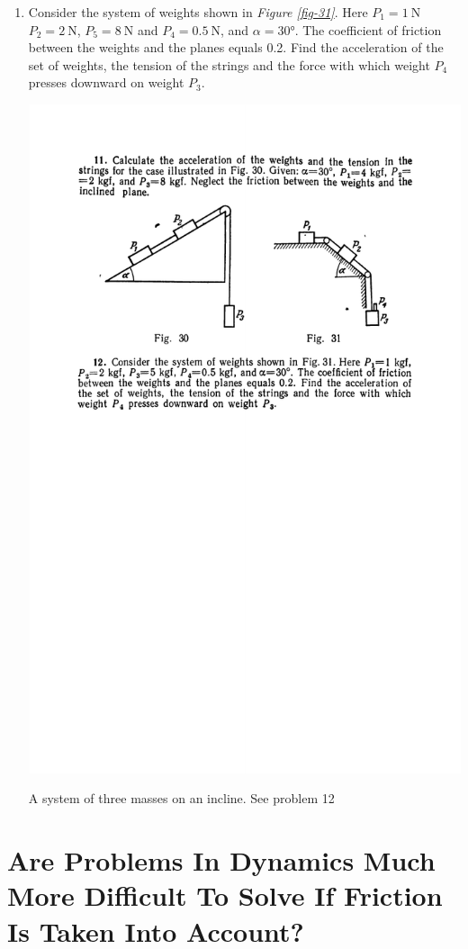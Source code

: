 \documentclass[a4paper,sfsidenotes]{tufte-book}
\begin{document}
\begin{enumerate}[resume*=problems]
\item Consider the system of weights shown in \emph{Figure \ref{fig-31}}. Here $P_{1}=\SI{1}{\newton}$$P_{2}=\SI{2}{\newton}$, $P_{5}=\SI{8}{\newton}$ and $P_{4}=\SI{0.5}{\newton}$, and $\alpha=\ang{30}$. The coefficient of friction between the weights and the planes equals 0.2. Find the acceleration of the set of weights, the tension of the strings and the force with which
weight $P_{4}$ presses downward on weight $P_{3}$.
\begin{marginfigure}
\centering
\includegraphics[width=0.8\linewidth]{fig-031a.pdf}
\caption{A system of three masses on an incline. See problem 12}
\label{fig-31}
\end{marginfigure}
\end{enumerate}
\chapter{Are Problems In Dynamics Much More Difficult To Solve If Friction Is Taken Into Account?}
\label{ch-07}
\end{document}
